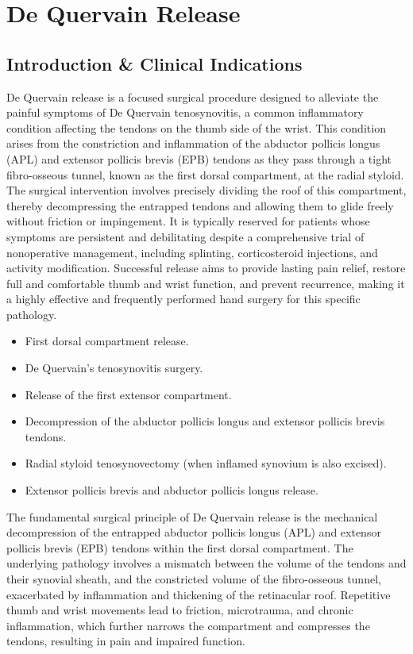\chapter{De Quervain Release}

\section*{Introduction \& Clinical Indications}
De Quervain release is a focused surgical procedure designed to alleviate the painful symptoms of De Quervain tenosynovitis, a common inflammatory condition affecting the tendons on the thumb side of the wrist. This condition arises from the constriction and inflammation of the abductor pollicis longus (APL) and extensor pollicis brevis (EPB) tendons as they pass through a tight fibro-osseous tunnel, known as the first dorsal compartment, at the radial styloid. The surgical intervention involves precisely dividing the roof of this compartment, thereby decompressing the entrapped tendons and allowing them to glide freely without friction or impingement. It is typically reserved for patients whose symptoms are persistent and debilitating despite a comprehensive trial of nonoperative management, including splinting, corticosteroid injections, and activity modification. Successful release aims to provide lasting pain relief, restore full and comfortable thumb and wrist function, and prevent recurrence, making it a highly effective and frequently performed hand surgery for this specific pathology.

\begin{itemize}
  \item First dorsal compartment release.
  \item De Quervain's tenosynovitis surgery.
  \item Release of the first extensor compartment.
  \item Decompression of the abductor pollicis longus and extensor pollicis brevis tendons.
  \item Radial styloid tenosynovectomy (when inflamed synovium is also excised).
  \item Extensor pollicis brevis and abductor pollicis longus release.
\end{itemize}

The fundamental surgical principle of De Quervain release is the mechanical decompression of the entrapped abductor pollicis longus (APL) and extensor pollicis brevis (EPB) tendons within the first dorsal compartment. The underlying pathology involves a mismatch between the volume of the tendons and their synovial sheath, and the constricted volume of the fibro-osseous tunnel, exacerbated by inflammation and thickening of the retinacular roof. Repetitive thumb and wrist movements lead to friction, microtrauma, and chronic inflammation, which further narrows the compartment and compresses the tendons, resulting in pain and impaired function.

